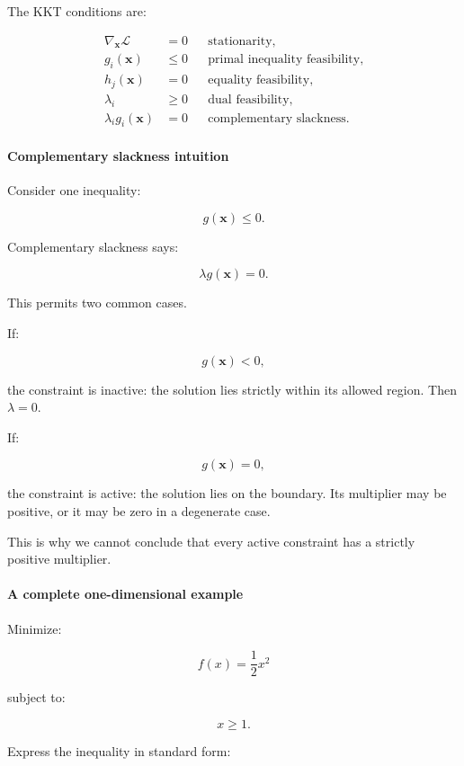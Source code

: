 The KKT conditions are:

\[
\boxed{ \begin{aligned} \nabla_{\mathbf x}\mathcal L&=0 &&\text{stationarity},\\ g_i(\mathbf x)&\le0 &&\text{primal inequality feasibility},\\ h_j(\mathbf x)&=0 &&\text{equality feasibility},\\ \lambda_i&\ge0 &&\text{dual feasibility},\\ \lambda_i g_i(\mathbf x)&=0 &&\text{complementary slackness}. \end{aligned} }
\]

\paragraph{Complementary slackness intuition}\label{02-foundations-ii-ch026-complementary-slackness-intuition}

Consider one inequality:

\[
g(\mathbf x)\le0.
\]

Complementary slackness says:

\[
\lambda g(\mathbf x)=0.
\]

This permits two common cases.

If:

\[
g(\mathbf x)<0,
\]

the constraint is inactive: the solution lies strictly within its allowed region. Then \(\lambda=0\).

If:

\[
g(\mathbf x)=0,
\]

the constraint is active: the solution lies on the boundary. Its multiplier may be positive, or it may be zero in a degenerate case.

This is why we cannot conclude that every active constraint has a strictly positive multiplier.

\paragraph{A complete one-dimensional example}\label{02-foundations-ii-ch026-a-complete-one-dimensional-example}

Minimize:

\[
f(x)=\frac12x^2
\]

subject to:

\[
x\ge1.
\]

Express the inequality in standard form:

